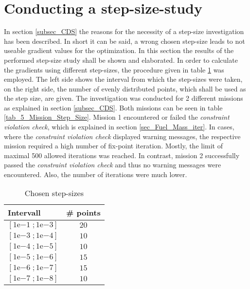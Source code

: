 \newpage
\FloatBarrier
\section{Conducting a step-size-study}
\label{sec_Step_Size_Study}
In section \ref{subsec_CDS} the reasons for 
the necessity of a step-size investigation 
has been described. In short it 
can be said, a wrong chosen step-size 
leads to not useable gradient values 
for the optimization. In this section the 
results of the performed step-size 
study shall be shown and elaborated.        
In order to calculate the gradients 
using different step-sizes, the 
procedure given in 
table \ref{tab_6} was employed.
The left side shows the interval 
from which the step-sizes were taken,  
on the right side, the number of evenly distributed 
points, which shall be used as the step size, 
are given. The investigation was conducted for 
2 different missions as explained in section 
\ref{subsec_CDS}. Both missions can be 
seen in table \ref{tab_5_Mission_Step_Size}.
Mission 1 encountered 
or failed the \emph{constraint violation check}, which 
is explained in section \ref{sec_Fuel_Mass_iter}.
In cases, where 
the \emph{constraint violation check} displayed warning 
messages, the respective mission required 
a high number of fix-point iteration. Mostly, the limit 
of maximal 500 allowed iterations was reached.
In contrast, mission 2 successfully passed 
the \emph{constraint violation check} and thus no 
warning messages were encountered. Also, 
the number of iterations were much lower.
\begin{table}[!h]
    \centering
        \begin{tabular}{l c}
            \multicolumn{1}{p{2cm}}{\textbf{Intervall}} &
            \multicolumn{1}{p{2cm}}{\textbf{\# points}}\\
            \hline
            $[1\mathrm{e}{-1} \; ; 1\mathrm{e}{-3} ]$ & $20$  \\
            $[1\mathrm{e}{-3} \; ; 1\mathrm{e}{-4} ]$ & $10$ \\
            $[1\mathrm{e}{-4} \; ; 1\mathrm{e}{-5} ]$ & $10$\\
            $[1\mathrm{e}{-5} \; ; 1\mathrm{e}{-6} ]$ & $15$\\
            $[1\mathrm{e}{-6} \; ; 1\mathrm{e}{-7} ]$ & $15$\\
            $[1\mathrm{e}{-7} \; ; 1\mathrm{e}{-8} ]$ & $10$\\
        \end{tabular}
        \caption{Chosen step-sizes }
        \label{tab_6}
\end{table}



